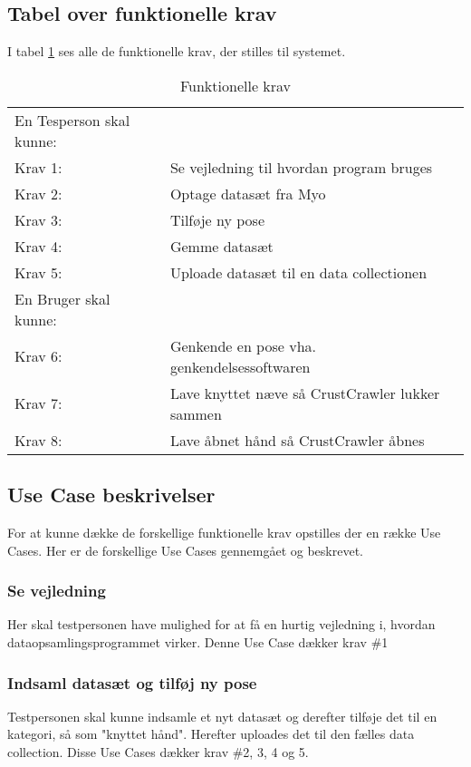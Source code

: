 \subsection*{Tabel over funktionelle krav}
I tabel \ref{tab:funktionellekrav} ses alle de funktionelle krav, der stilles til systemet.
\bgroup
\def\arraystretch{1.8}
\begin{center}
	\begin{table}
		\begin{tabular}{lp{225pt}}
			\rowcolor{grey} En Tesperson skal kunne: &\\
			Krav 1:& Se vejledning til hvordan program bruges\\
			Krav 2:& Optage datasæt fra Myo\\
			Krav 3:& Tilføje ny pose\\
			Krav 4:& Gemme datasæt\\
			Krav 5:& Uploade datasæt til en data collectionen\\
			\rowcolor{grey}En Bruger skal kunne: &\\
			Krav 6:& Genkende en pose vha. genkendelsessoftwaren\\
			Krav 7:& Lave knyttet næve så CrustCrawler lukker sammen\\
			Krav 8:& Lave åbnet hånd så CrustCrawler åbnes
		\end{tabular}
		\caption{Funktionelle krav}
		\label{tab:funktionellekrav}
	\end{table}	
\end{center}
\egroup

\subsection*{Use Case beskrivelser}
For at kunne dække de forskellige funktionelle krav opstilles der en række Use Cases. Her er de forskellige Use Cases gennemgået og beskrevet.

\subsubsection{Se vejledning}
Her skal testpersonen have mulighed for at få en hurtig vejledning i, hvordan dataopsamlingsprogrammet virker. Denne Use Case dækker krav \#1

\subsubsection{Indsaml datasæt og tilføj ny pose}
Testpersonen skal kunne indsamle et nyt datasæt og derefter tilføje det til en kategori, så som "knyttet hånd". Herefter uploades det til den fælles data collection. Disse Use Cases dækker krav \#2, 3, 4 og 5.
